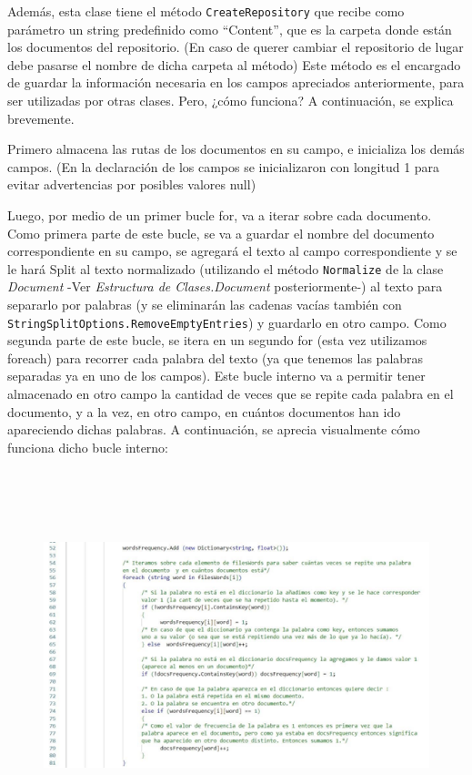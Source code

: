 \documentclass{article}
\begin{document}
Además, esta clase tiene el método {\texttt{CreateRepository}} que recibe como parámetro un string
predefinido como “Content”, que es la carpeta donde están los documentos del repositorio. (En
caso de querer cambiar el repositorio de lugar debe pasarse el nombre de dicha carpeta al
método) Este método es el encargado de guardar la información necesaria en los campos
apreciados anteriormente, para ser utilizadas por otras clases. Pero, ¿cómo funciona? A
continuación, se explica brevemente.


Primero almacena las rutas de los documentos en su campo, e inicializa los demás campos.
(En la declaración de los campos se inicializaron con longitud 1 para evitar advertencias por
posibles valores null)


Luego, por medio de un primer bucle for, va a iterar sobre cada documento. Como primera
parte de este bucle, se va a guardar el nombre del documento correspondiente en su campo,
se agregará el texto al campo correspondiente y se le hará Split al texto normalizado (utilizando
el método {\texttt{Normalize}} de la clase {\textit{Document}} -Ver {\textit{Estructura de Clases.Document}} posteriormente-) al texto
para separarlo por palabras (y se eliminarán las cadenas vacías también con
{\texttt{StringSplitOptions.RemoveEmptyEntries}}) y guardarlo en otro campo. Como segunda parte de
este bucle, se itera en un segundo for (esta vez utilizamos foreach) para recorrer cada palabra
del texto (ya que tenemos las palabras separadas ya en uno de los campos). Este bucle interno
va a permitir tener almacenado en otro campo la cantidad de veces que se repite cada palabra
en el documento, y a la vez, en otro campo, en cuántos documentos han ido apareciendo
dichas palabras. A continuación, se aprecia visualmente cómo funciona dicho bucle interno:


\

\begin{figure}[h]
	\begin{center}
		\includegraphics[width = 14cm, height = 9cm]{img2.png}
	\end{center}
\end{figure}
\end{document}

